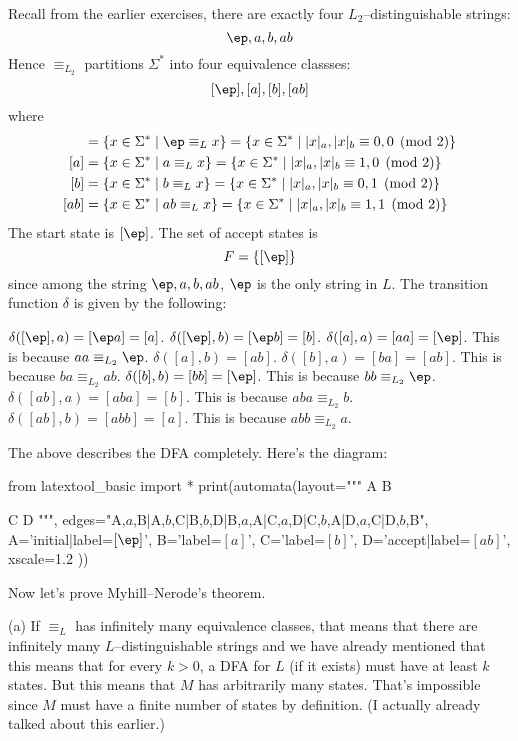 \SOLUTION
Recall from the earlier exercises, there are exactly four $L_2$--distinguishable strings:
\[
\ep, a, b, ab
\]
Hence $\equiv_{L_2}$ partitions $\Sigma^*$ into four equivalence classses:
\[
  [\ep], [a], [b], [ab]
\]
where
\begin{align*}
  [\ep] &= \{x \in \Sigma^* \mid \ep \equiv_L x \} = \{x \in \Sigma^* \mid |x|_a,|x|_b \equiv 0,0 \pmod{2} \} \\
  [a] &= \{x \in \Sigma^* \mid a \equiv_L x \} = \{x \in \Sigma^* \mid |x|_a,|x|_b \equiv 1,0 \pmod{2} \} \\
  [b] &= \{x \in \Sigma^* \mid b \equiv_L x \} = \{x \in \Sigma^* \mid |x|_a,|x|_b \equiv 0,1 \pmod{2} \} \\
  [ab] &= \{x \in \Sigma^* \mid ab \equiv_L x \} = \{x \in \Sigma^* \mid |x|_a,|x|_b \equiv 1,1 \pmod{2} \}
\end{align*}
The start state is $[\ep]$.
The set of accept states is
\[
F = \{[\ep]\}
\]
since among the string $\ep, a, b, ab$, $\ep$ is the
only string in $L$.
The transition function $\delta$ is given by the following:
\begin{enumerate}[label=\textnormal{(\alph*)},itemsep=0pt,nosep,noitemsep,partopsep=0pt,topsep=0pt,parsep=0pt]
  \li $\delta([\ep], a) = [\ep a] = [a]$.
  \li $\delta([\ep], b) = [\ep b] = [b]$.
  \li $\delta([a], a) = [aa] = [\ep]$. This is because $aa \equiv_{L_2} \ep$.
  \li $\delta([a], b) = [ab]$.
  \li $\delta([b], a) = [ba] = [ab]$. This is because $ba \equiv_{L_2} ab$.
  \li $\delta([b], b) = [bb] = [\ep]$. This is because $bb \equiv_{L_2} \ep$.
  \li $\delta([ab], a) = [aba] = [b]$. This is because $aba \equiv_{L_2} b$.
  \li $\delta([ab], b) = [abb] = [a]$. This is because $abb \equiv_{L_2} a$.
\end{enumerate}
The above describes the DFA completely.
Here's the diagram:

\begin{python}
from latextool_basic import *
print(automata(layout="""
A  B

C  D
""",
edges="A,$a$,B|A,$b$,C|B,$b$,D|B,$a$,A|C,$a$,D|C,$b$,A|D,$a$,C|D,$b$,B",
A='initial|label=$[\ep]$',
B='label=$[a]$',
C='label=$[b]$',
D='accept|label=$[ab]$',
xscale=1.2
))
\end{python}

\newpage

Now let's prove Myhill--Nerode's theorem.

\proof
(a) If $\equiv_L$ has infinitely many equivalence classes, that means that there are
infinitely many $L$--distinguishable strings and we have already mentioned that
this means that for every $k > 0$, a DFA for $L$ (if it exists) must have at least $k$ states.
But this means that $M$ has arbitrarily many states.
That's impossible since $M$ must have a finite number of states by definition.
(I actually already talked about this earlier.)


